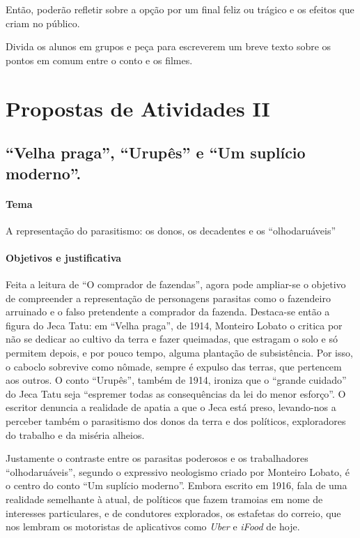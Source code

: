 \documentclass[11pt]{extarticle}
\begin{document}
Então, poderão refletir sobre a opção por um final feliz ou
trágico e os efeitos que criam no público.

Divida os alunos em grupos e peça para escreverem 
um breve texto sobre os pontos em comum entre o 
conto e os filmes.

\section{Propostas de Atividades II}
\subsection{``Velha praga'', ``Urupês'' e ``Um suplício moderno''.}

\paragraph{Tema} A representação do parasitismo: os donos, os decadentes e
os ``olhodaruáveis''


\paragraph{Objetivos e justificativa}
Feita a leitura de ``O comprador de fazendas'', agora pode ampliar-se o
objetivo de compreender a representação de personagens parasitas como o
fazendeiro arruinado e o falso pretendente a comprador da fazenda.
Destaca-se então a figura do Jeca Tatu: em ``Velha praga'', de 1914,
Monteiro Lobato o critica por não se dedicar ao cultivo da terra e fazer
queimadas, que estragam o solo e só permitem depois, e por pouco tempo,
alguma plantação de subsistência. Por isso, o caboclo sobrevive como
nômade, sempre é expulso das terras, que pertencem aos outros. O conto
``Urupês'', também de 1914, ironiza que o ``grande cuidado'' do Jeca
Tatu seja ``espremer todas as consequências da lei do menor esforço''. O
escritor denuncia a realidade de apatia a que o Jeca está preso,
levando-nos a perceber também o parasitismo dos donos da terra e dos
políticos, exploradores do trabalho e da miséria alheios.

Justamente o contraste entre os parasitas poderosos e os trabalhadores
``olhodaruáveis'', segundo o expressivo neologismo criado por Monteiro
Lobato, é o centro do conto ``Um suplício moderno''. Embora escrito em
1916, fala de uma realidade semelhante à atual, de políticos que fazem
tramoias em nome de interesses particulares, e de condutores explorados,
os estafetas do correio, que nos lembram os motoristas de aplicativos
como \emph{Uber} e \emph{iFood} de hoje.
\end{document}
